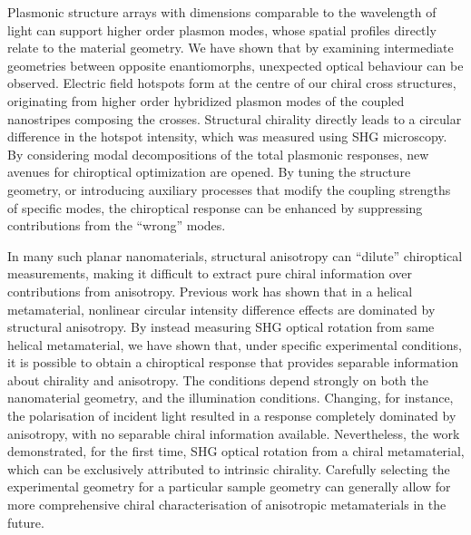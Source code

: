 Plasmonic structure arrays with dimensions comparable to the wavelength of light can support higher order plasmon modes, whose spatial profiles directly relate to the material geometry. We have shown that by examining intermediate geometries between opposite enantiomorphs, unexpected optical behaviour can be observed. Electric field hotspots form at the centre of our chiral cross structures, originating from higher order hybridized plasmon modes of the coupled nanostripes composing the crosses. Structural chirality directly leads to a circular difference in the hotspot intensity, which was measured using SHG microscopy. By considering modal decompositions of the total plasmonic responses, new avenues for chiroptical optimization are opened. By tuning the structure geometry, or introducing auxiliary processes that modify the coupling strengths of specific modes, the chiroptical response can be enhanced by suppressing contributions from the ``wrong'' modes.

In many such planar nanomaterials, structural anisotropy can ``dilute'' chiroptical measurements, making it difficult to extract pure chiral information over contributions from anisotropy. Previous work has shown that in a helical metamaterial, nonlinear circular intensity difference effects are dominated by structural anisotropy. By instead measuring SHG optical rotation from same helical metamaterial, we have shown that, under specific experimental conditions, it is possible to obtain a chiroptical response that provides separable information about chirality and anisotropy. The conditions depend strongly on both the nanomaterial geometry, and the illumination conditions. Changing, for instance, the polarisation of incident light resulted in a response completely dominated by anisotropy, with no separable chiral information available. Nevertheless, the work demonstrated, for the first time, SHG optical rotation from a chiral metamaterial, which can be exclusively attributed to intrinsic chirality. Carefully selecting the experimental geometry for a particular sample geometry can generally allow for more comprehensive chiral characterisation of anisotropic metamaterials in the future.

